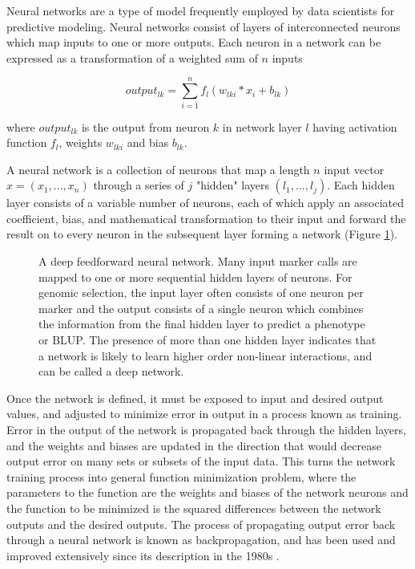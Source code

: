 \documentclass[9pt,twocolumn,twoside]{g3_article/gsag3jnl}
\begin{document}
Neural networks are a type of model frequently employed by data scientists
for predictive modeling. Neural networks consist of layers of interconnected neurons
which map inputs to one or more outputs. Each neuron in a network can be expressed as a 
transformation of a weighted sum of $n$ inputs 

\begin{equation}
    output_{lk} = \sum_{i=1}^{n} f_l(w_{lki} * x_{i} + b_{lk})
\label{eq:neuron}
\end{equation}

where $output_{lk}$ is the output from neuron $k$ in network layer $l$ having activation
function $f_l$, weights $w_{lki}$ and bias $b_{lk}$.

A neural network is a collection of neurons that map a 
length $n$ input vector $x = (x_1, ..., x_n)$ through a series of $j$ 
"hidden" layers $(l_1, ..., l_j)$. Each hidden layer consists of a variable 
number of neurons, each of which apply an associated coefficient, bias, and 
mathematical transformation to their input and forward the 
result on to every neuron in the subsequent layer forming a network (Figure \ref{fig:deepnet}).

\begin{figure}[htbp]
\renewcommand{\familydefault}{\sfdefault}\normalfont
\centering

\caption{A deep feedforward neural network. Many input marker calls are mapped 
to one or more sequential hidden layers of neurons. For genomic selection, the
input layer often consists of one neuron per marker and the output consists of a single
neuron which combines the information from the final hidden layer to predict a phenotype or BLUP.
The presence of more than one hidden layer indicates that a network is likely to learn
higher order non-linear interactions, and can be called a deep network.}
\label{fig:deepnet}
\end{figure}

Once the network is defined, it must be exposed to input and desired output
values, and adjusted to minimize error in output in a process known as training.
Error in the output of the network is propagated back through the hidden 
layers, and the weights and biases are updated in the direction that would 
decrease output error on many sets or subsets of the input data. 
This turns the network training process into general 
function minimization problem, where the parameters to the function are the 
weights and biases of the network neurons and the function to be 
minimized is the squared differences between the network outputs and 
the desired outputs. The process of propagating output error back 
through a neural network is known as backpropagation, and has been used 
and improved extensively since its description in the 1980s \citep{rumelhart1986}. 
\end{document}

